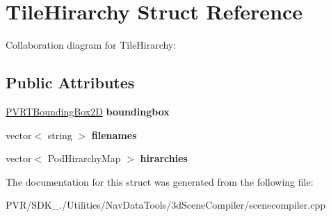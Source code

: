 \hypertarget{struct_tile_hirarchy}{\section{Tile\+Hirarchy Struct Reference}
\label{struct_tile_hirarchy}
}


Collaboration diagram for Tile\+Hirarchy\+:
\subsection*{Public Attributes}
\begin{DoxyCompactItemize}
\item 
\hypertarget{struct_tile_hirarchy_abd3d143fa6b44199abfa3e26b586a02c}{\hyperlink{structpvrnavigation_1_1_p_v_r_t_bounding_box2_d}{P\+V\+R\+T\+Bounding\+Box2\+D} {\bfseries boundingbox}}\label{struct_tile_hirarchy_abd3d143fa6b44199abfa3e26b586a02c}

\item 
\hypertarget{struct_tile_hirarchy_a9e9ffbc30e49c2fca5a9be05c9a5dae0}{vector$<$ string $>$ {\bfseries filenames}}\label{struct_tile_hirarchy_a9e9ffbc30e49c2fca5a9be05c9a5dae0}

\item 
\hypertarget{struct_tile_hirarchy_a342ac6ab97950c792b18ef0bb289badc}{vector$<$ Pod\+Hirarchy\+Map $>$ {\bfseries hirarchies}}\label{struct_tile_hirarchy_a342ac6ab97950c792b18ef0bb289badc}

\end{DoxyCompactItemize}


The documentation for this struct was generated from the following file\+:\begin{DoxyCompactItemize}
\item 
P\+V\+R/\+S\+D\+K\+\_./\+Utilities/\+Nav\+Data\+Tools/3d\+Scene\+Compiler/scenecompiler.\+cpp\end{DoxyCompactItemize}
